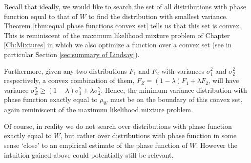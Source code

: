 Recall that ideally, we would like to search the set of all distributions with phase function equal to that of $W$ to find the distribution with smallest variance. Theorem \ref{thm:equal phase functions convex set} tells us that this set is convex. This is reminiscent of the maximum likelihood mixture problem of Chapter \ref{Ch:Mixtures} in which we also optimize a function over a convex set (see in particular Section \ref{sec:summary of Lindsay}).

Furthermore, given any two distributions $F_1$ and $F_2$ with variances $\sigma_1^2$ and $\sigma_2^2$ respectively, a convex combination of them, $F_Z = (1 - \lambda)F_1 + \lambda F_2$, will have variance $\sigma_Z^2 \geq (1 - \lambda) \sigma_1^2 + \lambda \sigma_2^2$. Hence, the minimum variance distribution with phase function exactly equal to $\rho_W$ must be on the boundary of this convex set, again reminiscent of the maximum likelihood mixture problem.





Of course, in reality we do not search over distributions with phase function exactly equal to $W$, but rather over distributions with phase function in some sense `close' to an empirical estimate of the phase function of $W$. However the intuition gained above could potentially still be relevant.





